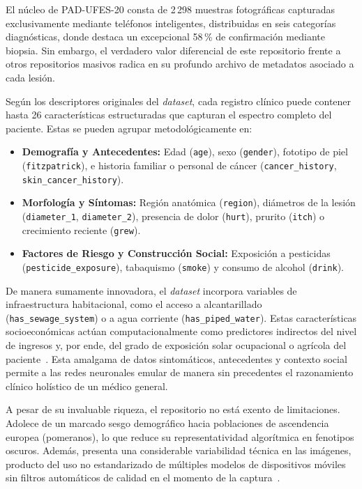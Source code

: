 El núcleo de PAD-UFES-20 consta de 2\,298 muestras fotográficas capturadas exclusivamente mediante 
teléfonos inteligentes, distribuidas en seis categorías diagnósticas, donde destaca un excepcional 
58\,\% de confirmación mediante biopsia. Sin embargo, el verdadero valor diferencial de este 
repositorio frente a otros repositorios masivos radica en su profundo archivo de metadatos asociado 
a cada lesión.~\cite{pmc_padufes}

Según los descriptores originales del \textit{dataset}, cada registro clínico puede contener hasta 
26 características estructuradas que capturan el espectro completo del paciente. Estas se pueden 
agrupar metodológicamente en:
\begin{itemize}
    \item \textbf{Demografía y Antecedentes:} Edad (\texttt{age}), sexo (\texttt{gender}), fototipo de piel (\texttt{fitzpatrick}), e historia familiar o personal de cáncer (\texttt{cancer\_history}, \texttt{skin\_cancer\_history}).
    \item \textbf{Morfología y Síntomas:} Región anatómica (\texttt{region}), diámetros de la lesión (\texttt{diameter\_1}, \texttt{diameter\_2}), presencia de dolor (\texttt{hurt}), prurito (\texttt{itch}) o crecimiento reciente (\texttt{grew}).
    \item \textbf{Factores de Riesgo y Construcción Social:} Exposición a pesticidas (\texttt{pesticide\_exposure}), tabaquismo (\texttt{smoke}) y consumo de alcohol (\texttt{drink}).
\end{itemize}

De manera sumamente innovadora, el \textit{dataset} incorpora variables de infraestructura 
habitacional, como el acceso a alcantarillado (\texttt{has\_sewage\_system}) o a agua 
corriente (\texttt{has\_piped\_water}). Estas características socioeconómicas actúan computacionalmente 
como predictores indirectos del nivel de ingresos y, por ende, del grado de 
exposición solar ocupacional o agrícola del paciente~\cite{jmir_padufes_social}. Esta amalgama de 
datos sintomáticos, antecedentes y contexto social permite a las redes neuronales emular de manera 
sin precedentes el razonamiento clínico holístico de un médico general.

A pesar de su invaluable riqueza, el repositorio no está exento de limitaciones. Adolece de un marcado 
sesgo demográfico hacia poblaciones de ascendencia europea (pomeranos), lo que reduce su 
representatividad algorítmica en fenotipos oscuros. Además, presenta una considerable variabilidad 
técnica en las imágenes, producto del uso no estandarizado de múltiples modelos de dispositivos 
móviles sin filtros automáticos de calidad en el momento de la captura~\cite{pmc_padufes}.

